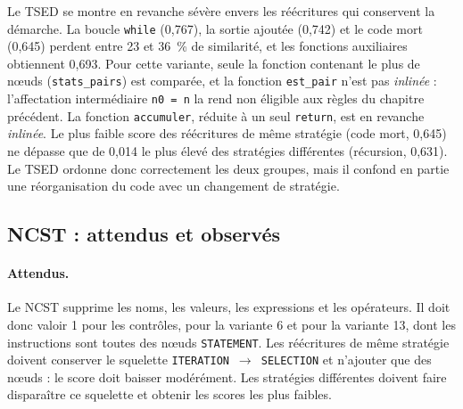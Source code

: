\documentclass[12pt,a4paper,oneside]{report}
\begin{document}
Le TSED se montre en revanche sévère envers les réécritures qui conservent la
démarche. La boucle \texttt{while} (0,767), la sortie ajoutée (0,742) et le
code mort (0,645) perdent entre 23 et 36~\% de similarité, et les
fonctions auxiliaires obtiennent 0,693. Pour cette variante, seule la fonction
contenant le plus de nœuds (\texttt{stats\_pairs}) est comparée, et la
fonction \texttt{est\_pair} n'est pas \emph{inlinée} : l'affectation
intermédiaire \texttt{n0 = n} la rend non éligible aux règles du chapitre
précédent. La fonction \texttt{accumuler}, réduite à un seul \texttt{return},
est en revanche \emph{inlinée}. Le plus faible score des réécritures de même
stratégie (code mort, 0,645) ne dépasse que de 0,014 le plus élevé des
stratégies différentes (récursion, 0,631). Le TSED ordonne donc correctement
les deux groupes, mais il confond en partie une réorganisation du code avec
un changement de stratégie.

\subsection{NCST : attendus et observés}

\paragraph{Attendus.}
Le NCST supprime les noms, les valeurs, les expressions et les opérateurs. Il
doit donc valoir 1 pour les contrôles, pour la variante 6 et pour la
variante 13, dont les instructions sont toutes des nœuds \texttt{STATEMENT}.
Les réécritures de même stratégie doivent conserver le squelette
\texttt{ITERATION}~$\rightarrow$~\texttt{SELECTION} et n'ajouter que des nœuds :
le score doit baisser modérément. Les stratégies différentes doivent faire
disparaître ce squelette et obtenir les scores les plus faibles.
\end{document}

